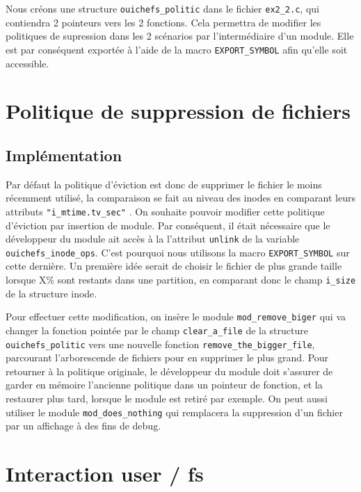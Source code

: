 \documentclass{article}
\begin{document}
	Nous créons une structure \verb|ouichefs_politic| dans le fichier \verb|ex2_2.c|, qui contiendra 2 pointeurs vers les 2 fonctions. Cela permettra de modifier les politiques de supression dans les 2 scénarios par l'intermédiaire d'un module. Elle est par conséquent exportée à l'aide de la macro \verb|EXPORT_SYMBOL| afin qu'elle soit accessible.

	\section{Politique de suppression de fichiers}
	\subsection{Implémentation}
	Par défaut la politique d'éviction est donc de supprimer le fichier le moins récemment utilisé,  la comparaison se fait au niveau des inodes en comparant leurs attributs \verb|"i_mtime.tv_sec"| .\newline
	On souhaite pouvoir modifier cette politique d'éviction par insertion de module. Par conséquent, il était nécessaire que le développeur du module ait accès à la l'attribut \verb|unlink| de la variable \verb|ouichefs_inode_ops|. C'est pourquoi nous utilisons la macro \verb|EXPORT_SYMBOL| sur cette dernière.
	Un première idée serait de choisir le fichier de plus grande taille lorsque X\% sont restants dans une partition, en comparant donc le champ \verb|i_size| de la structure inode.\newline

	Pour effectuer cette modification, on insère le module \verb|mod_remove_biger| qui va changer la fonction pointée par le champ \verb|clear_a_file| de la structure \verb|ouichefs_politic| vers une nouvelle fonction \verb|remove_the_bigger_file|, parcourant l'arborescende de fichiers pour en supprimer le plus grand.\newline
	Pour retourner à la politique originale, le développeur du module doit s'assurer de garder en mémoire l'ancienne politique dans un pointeur de fonction, et la restaurer plus tard, lorsque le module est retiré par exemple.\newline
	On peut aussi utiliser le module \verb|mod_does_nothing| qui remplacera la suppression d'un fichier par un affichage à des fins de debug.

	\section{Interaction user / fs}
\end{document}
